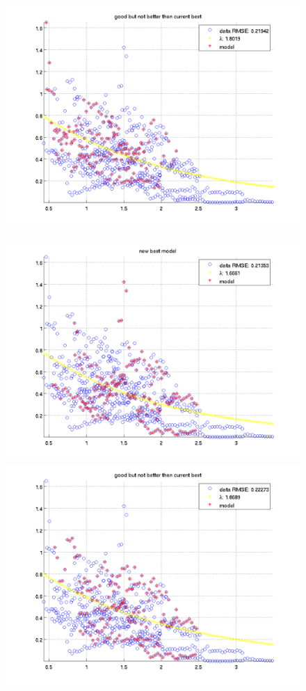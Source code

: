 \documentclass[12pt]{report}
\begin{document}
\begin{figure}[H]
\begin{minipage}[t]{0.5\linewidth}
	\includegraphics[scale=\imFeatRan]{images/ransac11}\\
\end{minipage}
\begin{minipage}[t]{0.5\linewidth}
	\centering
	\includegraphics[scale=\imFeatRan]{images/ransac8}\\
	\includegraphics[scale=\imFeatRan]{images/ransac10}\\

\end{minipage}
\end{figure}
\end{document}
